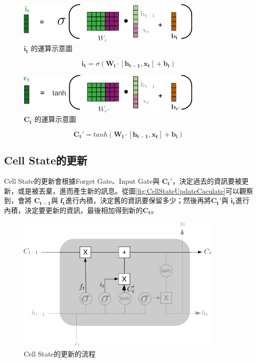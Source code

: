 \begin{figure}[H]
	\centering
	\includegraphics[width=9cm]{./pic/P11XgmjT.png}
	\caption{\(\mathbf{i_t}\) 的運算示意圖}
	\label{fig:InputGateCaculate}
\end{figure}

\begin{equation}
	\label{eqn:InputGateCalculate}
	\mathbf{i_t} = \sigma(\mathbf{W_i\cdot[h_{t-1},x_t]+b_i})
\end{equation}

\begin{figure}[H]
	\centering
	\includegraphics[width=9cm]{./pic/EI5hsLBg.png}
	\caption{\(\mathbf{C_t}\) 的運算示意圖}
	\label{fig:InputCalculate}
\end{figure}


\begin{equation}
	\label{eqn:InputCalculate}
	\mathbf{C_t'} = tanh(\mathbf{W_i\cdot[h_{t-1},x_t]+b_i})
\end{equation}

\subsection{Cell State的更新}

Cell State的更新會根據Forget Gate、Input Gate與 \(\mathbf{C_t'}\)，決定過去的資訊要被更新，或是被丟棄，進而產生新的訊息。從圖\ref{fig:CellStateUpdateCaculate}可以觀察到，會將 \(\mathbf{C_{t-1}}\)與 \(\mathbf{f_t}\)進行內積，決定舊的資訊要保留多少；然後再將\(\mathbf{C_t'}\)與 \(\mathbf{i_t}\)進行內積，決定要更新的資訊，最後相加得到新的\(\mathbf{C_t}\)。

\begin{figure}[H]
	\centering
	\includegraphics[width=10cm]{./pic/rQqms2xi.png}
	\caption{Cell State的更新的流程}
	\label{fig:CellStateUpdate}
\end{figure}


